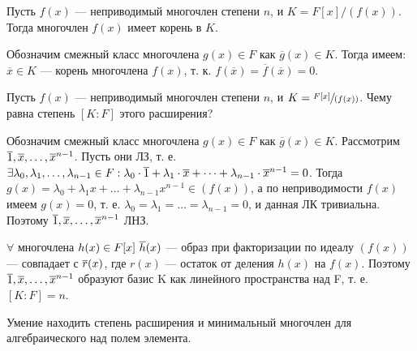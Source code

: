 \begin{problem}
Пусть $f(x)$ --- неприводимый многочлен степени $n$, и $K = F[x]/(f(x))$. Тогда многочлен $f(x)$ имеет корень в $K$.
\end{problem}

\begin{solution}
Обозначим смежный класс многочлена \(g(x) \in F\) как \(\overline{g}(x) \in K\). Тогда имеем: \(\overline{x} \in K\) --- корень многочлена \(f(x)\), т. к. \(f(\overline{x}) = \overline{f}(\overline{x}) = 0\).
\end{solution}

\begin{problem}
Пусть $f(x)$ --- неприводимый многочлен степени $n$, и $K = \sfrac{F[x]}{(f(x))}$. Чему равна степень $[K : F]$ этого расширения?
\end{problem}

\begin{solution}
Обозначим смежный класс многочлена \(g(x) \in F\) как \(\overline{g}(x) \in K\). Рассмотрим \(\overline{1}, \overline{x}, \dots, \overline{x}^{n-1}\). Пусть они ЛЗ, т. е. \(\exists \lambda_0, \lambda_1, \dots, \lambda_{n-1} \in F: \lambda_0\cdot\overline{1}+\lambda_1\cdot\overline{x}+\dots+\lambda_{n-1}\cdot\overline{x}^{n-1} = 0\). Тогда \(g(x) = \lambda_0+\lambda_1x+\dots+\lambda_{n-1}x^{n-1} \in (f(x))\), а по неприводимости \(f(x)\) имеем \(g(x) = 0\), т. е. \(\lambda_0 = \lambda_1 = \dots = \lambda_{n-1} = 0\), и данная ЛК тривиальна. Поэтому \(\overline{1}, \overline{x}, \dots, \overline{x}^{n-1}\) ЛНЗ.

\(\forall\) многочлена \(h(x) \in F[x] \ \overline{h}(x)\) --- образ при факторизации по идеалу \((f(x))\) --- совпадает с \(\overline{r}(x)\), где \(r(x)\) --- остаток от деления \(h(x)\) на \(f(x)\). Поэтому \(\overline{1}, \overline{x}, \dots, \overline{x}^{n-1}\) образуют базис K как линейного пространства над F, т. е. \([K:F] = n\).
\end{solution}

\begin{problem}[34 (7.9,7.10)] Умение находить степень расширения и минимальный многочлен для алгебраического над полем элемента.
\end{problem}


